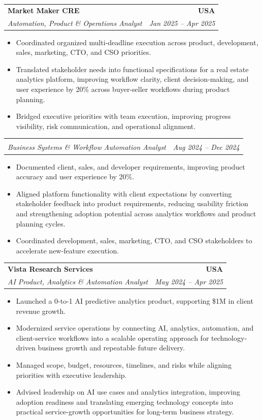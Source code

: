\documentclass[letterpaper,10pt]{article}
\makeatletter
\newcommand{\resumeItem}[1]{\item \small{#1}}
\newcommand{\resumeSubheading}[4]{
  \vspace{1pt}\item
    \begin{tabular*}{1.0\textwidth}[t]{l@{\extracolsep{\fill}}r}
      \textbf{#1} & \textbf{\small #2} \\
      \textit{\small #3} & \textit{\small #4} \\
    \end{tabular*}\vspace{-6pt}
}
\newcommand{\resumeItemListStart}{\begin{itemize}[leftmargin=0.15in, itemsep=1pt, topsep=3pt]}
\newcommand{\resumeItemListEnd}{\end{itemize}\vspace{-2pt}}
\makeatother
\begin{document}
\vspace{-2pt}

\resumeSubheading
{Market Maker CRE}{USA}
{Automation, Product \& Operations Analyst}{Jan 2025 -- Apr 2025}
\resumeItemListStart
\resumeItem{Coordinated organized multi-deadline execution across product, development, sales, marketing, CTO, and CSO priorities.}
\resumeItem{Translated stakeholder needs into functional specifications for a real estate analytics platform, improving workflow clarity, client decision-making, and user experience by 20\% across buyer-seller workflows during product planning.}
\resumeItem{Bridged executive priorities with team execution, improving progress visibility, risk communication, and operational alignment.}
\resumeItemListEnd

\vspace{-2pt}

\resumeSubheading
{}{}
{Business Systems \& Workflow Automation Analyst}{Aug 2024 -- Dec 2024}
\resumeItemListStart
\resumeItem{Documented client, sales, and developer requirements, improving product accuracy and user experience by 20\%.}
\resumeItem{Aligned platform functionality with client expectations by converting stakeholder feedback into product requirements, reducing usability friction and strengthening adoption potential across analytics workflows and product planning cycles.}
\resumeItem{Coordinated development, sales, marketing, CTO, and CSO stakeholders to accelerate new-feature execution.}
\resumeItemListEnd

\vspace{-2pt}

\resumeSubheading
{Vista Research Services}{USA}
{AI Product, Analytics \& Automation Analyst}{May 2024 -- Apr 2025}
\resumeItemListStart
\resumeItem{Launched a 0-to-1 AI predictive analytics product, supporting \$1M in client revenue growth.}
\resumeItem{Modernized service operations by connecting AI, analytics, automation, and client-service workflows into a scalable operating approach for technology-driven business growth and repeatable future delivery.}
\resumeItem{Managed scope, budget, resources, timelines, and risks while aligning priorities with executive leadership.}
\resumeItem{Advised leadership on AI use cases and analytics integration, improving adoption readiness and translating emerging technology concepts into practical service-growth opportunities for long-term business strategy.}
\resumeItemListEnd

\vspace{-2pt}
\end{document}
